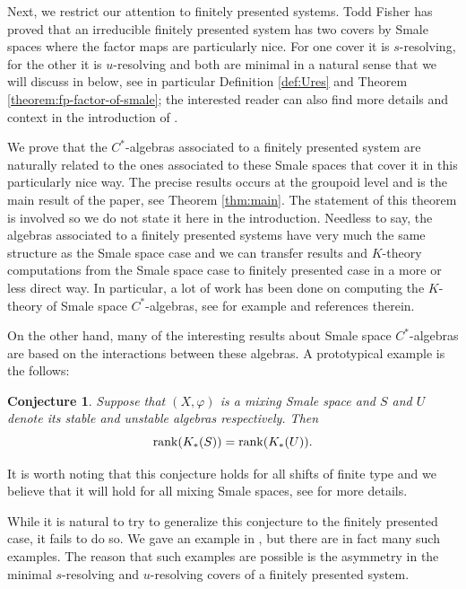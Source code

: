 \documentclass{amsart}
\theoremstyle{plain}
\newtheorem{conjecture}[theorem]{Conjecture}
\theoremstyle{definition}
\theoremstyle{remark}
\begin{document}
Next, we restrict our attention to finitely presented systems. Todd Fisher \cite{fisher13} has proved that an irreducible finitely presented system has two covers by Smale spaces where the factor maps are particularly nice. For one cover it is $s$-resolving, for the other it is $u$-resolving and both are minimal in a natural sense that we will discuss in below, see in particular Definition \ref{def:Ures} and Theorem \ref{theorem:fp-factor-of-smale}; the interested reader can also find more details and context in the introduction of \cite{fisher13}. 

We prove that the $C^\ast$-algebras associated to a finitely presented system are naturally related to the ones associated to these Smale spaces that cover it in this particularly nice way. The precise results occurs at the groupoid level and is the main result of the paper, see Theorem \ref{thm:main}. The statement of this theorem is involved so we do not state it here in the introduction. Needless to say, the algebras associated to a finitely presented systems have very much the same structure as the Smale space case and we can transfer results and $K$-theory computations from the Smale space case to finitely presented case in a more or less direct way. In particular, a lot of work has been done on computing the $K$-theory of Smale space $C^*$-algebras, see for example \cite{DeeYas_2020, ProYam_2022, ProYam_2023, ProYam_preprint3, ProYam_preprint4} and references therein.

On the other hand, many of the interesting results about Smale space $C^\ast$-algebras are based on the interactions between these algebras. A prototypical example is the follows: 
\begin{conjecture}
Suppose that $(X, \varphi)$ is a mixing Smale space and $S$ and $U$ denote its stable and unstable algebras respectively. Then 
\[
{\rm rank}(K_*(S))={\rm rank}(K_*(U)).
\]
\end{conjecture}
It is worth noting that this conjecture holds for all shifts of finite type and we believe that it will hold for all mixing Smale spaces, see \cite{ProYam_2022, ProYam_2023, ProYam_preprint3, ProYam_preprint4} for more details.

While it is natural to try to generalize this conjecture to the finitely presented case, it fails to do so. We gave an example in \cite{DeeStoShift}, but there are in fact many such examples. The reason that such examples are possible is the asymmetry in the minimal $s$-resolving and $u$-resolving covers of a finitely presented system.
\end{document}
